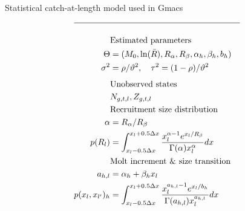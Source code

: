 \begin{table}
  \centering
\caption{Statistical catch-at-length model used in Gmacs}
\label{tab:statistical_catch_length_model}
\tableEq
    \begin{align}
        \hline \nonumber \\
        &\mbox{Estimated parameters} \nonumber\\
        \Theta&= 
                (M_0,\ln(\bar{R}),R_\alpha,R_\beta, 
                \alpha_h, \beta_h,b_h)\label{T4.1}\\
        \sigma^2&=\rho /\vartheta^2, \quad
        \tau^2=(1-\rho)/\vartheta^2\label{T4.2}\\[1ex]
        &\mbox{Unobserved states} \nonumber\\
        &N_{g,t,l},Z_{g,t,l}    \label{T4.3}\\
    	&\mbox{Recruitment size distribution} \nonumber\\
    	\alpha &= R_\alpha /R_\beta \\
    	p(R_l) &= \int_{x_l-0.5\Delta x}^{x_l+0.5\Delta x} 
    	\frac{x_l^{\alpha-1}e^{x_l/R_\beta}}{\Gamma(\alpha)x_l^\alpha}dx 
        \label{T4.4}\\
        &\mbox{Molt increment \& size transition} \nonumber\\  
        a_{h,l} &= \alpha_h + \beta_h x_l \label{T4.5} \\
        p(x_l,x_{l'})_h &= \int_{x_l-0.5\Delta x}^{x_l+0.5\Delta x}
        \frac{ x_l^{a_{h,l}-1} e^{x_l/b_h} }
        { \Gamma(a_{h,l}) x_l^{a_{h,l}} } dx \label{T4.6} \\

\end{align}
\end{table}
